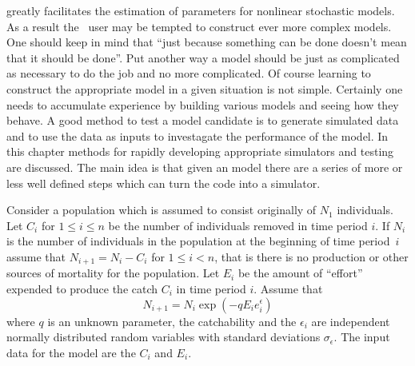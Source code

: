\def\kerntwo{\kern -4pt}


\ADMS greatly facilitates the estimation of parameters for
nonlinear stochastic models. As a result the \ADM\ user may
be tempted to construct ever more complex models. One should keep
in mind that ``just because something can be done doesn't mean
that it should be done''. Put another way a model should be
just as complicated as necessary to do the job and no
more complicated. Of course learning to construct the 
appropriate model in a given situation is not simple. 
Certainly one needs to accumulate experience by building
various models and seeing how they behave. A good method to
test a model candidate is to generate simulated data 
and to use the data as inputs to investagate the performance
of the model. In this chapter methods for rapidly developing
appropriate simulators and testing are discussed. The main idea
is that given an \ADMS model there are a series of more or less
well defined steps which can turn the code into a simulator. 




Consider a population which is assumed to consist originally of
$N_1$ individuals. Let $C_i$ for $1\le i\le n$ be the number of
individuals removed in time period $i$. If $N_i$ is the number
of individuals in the population at the beginning of time period~$i$
assume that $N_{i+1}=N_i-C_i$ for $1\le i< n$, that is there is
no production or other sources of mortality for the
population. Let $E_i$ be the amount of ``effort'' expended
to produce the catch $C_i$ in time period $i$. Assume that
$$N_{i+1}=N_i\exp(-qE_ie^\epsilon_i)$$ 
where $q$ is an
unknown parameter, the catchability and the $\epsilon_i$
are independent normally distributed random variables with
standard deviations $\sigma_\epsilon$.
The input data for the model are the $C_i$ and $E_i$.



